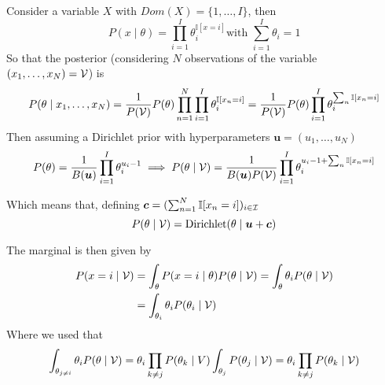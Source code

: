  Consider a variable \(X\) with \(Dom(X) = \{1, \dots, I\}\), then
 \[
   P(x \mid \theta) = \prod_{i = 1}^{I}\theta_{i}^{\mathbb{I}[x = i]} \text{
   with  } \sum_{i=1}^{I}\theta_{i} = 1
\]
So that the posterior (considering \(N\) observations of the variable
\((x_{1}, \dots, x_{N}) = \mathcal{V}\)) is
\[
  P(\theta \mid x_{1},\dots,x_{N}) = \frac{1}{P(\mathcal{V})} P(\theta) \prod_{n = 1}^{N}\prod_{i =1 }^{I}\theta_{i}^{\mathbb{I}[x_{n} = i]} =  \frac{1}{P(\mathcal{V})} P(\theta) \prod_{i = 1}^{I} \theta_{i}^{\sum_{n} \mathbb{I}[x_{n}=i]}
\]
Then assuming a Dirichlet prior with hyperparameters \(\bm{u} = (u_{1}, \dots, u_{N})\)
\[
  P(\theta) = \frac{1}{B(\bm{u})}\prod_{i =1}^{I}\theta_{i}^{u_{i}-1} \implies P(\theta \mid \mathcal{V}) = \frac{1}{B(\bm{u})P(\mathcal{V})}\prod_{i=1}^{I}\theta_{i}^{u_{i}-1 + \sum_{n}\mathbb{I}[x_{n} = i]}
\]

Which means that, defining \(\bm{c} = ( \sum_{n=1}^{N}\mathbb{I}[x_{n} = i])_{i \in \mathcal{I}}\)
\[
  P(\theta \mid \mathcal{V}) = \text{Dirichlet}(\theta \mid \bm{u} + \bm{c})
\]

The marginal is then given by
\[
  \begin{aligned}
    P(x=i \mid \mathcal{V}) &= \int_{\theta}P(x=i \mid \theta)P(\theta \mid \mathcal{V}) =  \int_{\theta}\theta_{i}P(\theta \mid \mathcal{V})\\
    &=  \int_{\theta_{i}}\theta_{i}P(\theta_{i} \mid \mathcal{V})
\end{aligned}
\]
Where we used that
\[\int_{\theta_{j \neq i}}\theta_{i} P(\theta \mid \mathcal{V}) = \theta_{i}\prod_{k\neq j}P(\theta_{k} \mid V) \int_{\theta_{j}}P(\theta_{j}\mid \mathcal{V}) = \theta_{i} \prod_{k \neq j}P(\theta_{k} \mid \mathcal{V})\]
